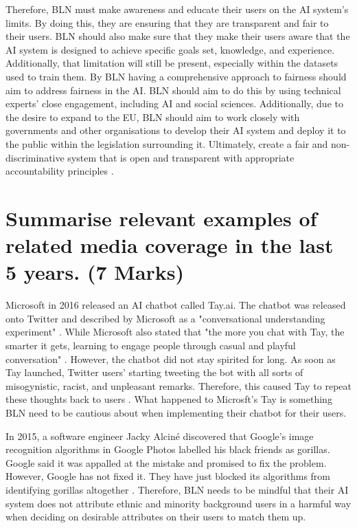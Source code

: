 \documentclass[a4paper,10pt]{article}
\begin{document}
	Therefore, BLN must make awareness and educate their users on the AI system's limits. By doing this, they are ensuring that they are transparent and fair to their users. BLN should also make sure that they make their users aware that the AI system is designed to achieve specific goals set, knowledge, and experience.  Additionally, that limitation will still be present, especially within the datasets used to train them. By BLN having a comprehensive approach to fairness should aim to address fairness in the AI. BLN should aim to do this by using technical experts' close engagement, including AI and social sciences. Additionally, due to the desire to expand to the EU, BLN should aim to work closely with governments and other organisations to develop their AI system and deploy it to the public within the legislation surrounding it. Ultimately, create a fair and non-discriminative system that is open and transparent with appropriate accountability principles \cite{adam_slides_regulating_ai}.


\section{Summarise relevant examples of related media coverage in the last 5 years. (7 Marks)}

	Microsoft in 2016 released an AI chatbot called Tay.ai. The chatbot was released onto Twitter and described by Microsoft as a "conversational understanding experiment" \cite{msft_twit_ai}. While Microsoft also stated that "the more you chat with Tay, the smarter it gets, learning to engage people through casual and playful conversation" \cite{msft_twit_ai}. However, the chatbot did not stay spirited for long. As soon as Tay launched, Twitter users' starting tweeting the bot with all sorts of misogynistic, racist, and unpleasant remarks. Therefore, this caused Tay to repeat these thoughts back to users \cite{msft_twit_ai}. What happened to Microsft's Tay is something BLN need to be cautious about when implementing their chatbot for their users.

	In 2015, a software engineer Jacky Alciné discovered that Google's image recognition algorithms in Google Photos labelled his black friends as gorillas. Google said it was appalled at the mistake and promised to fix the problem. However, Google has not fixed it. They have just blocked its algorithms from identifying gorillas altogether \cite{google_gorrila}. Therefore, BLN needs to be mindful that their AI system does not attribute ethnic and minority background users in a harmful way when deciding on desirable attributes on their users to match them up.
\end{document}

